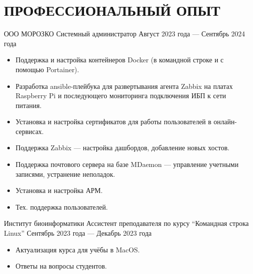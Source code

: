 \section{ПРОФЕССИОНАЛЬНЫЙ ОПЫТ}

    \job
        {ООО МОРОЗКО}
        {Системный администратор}
        {Август 2023 года --- Сентябрь 2024 года}

        \begin{itemize}
            \setlength\itemsep{-.5em}
            \item Поддержка и настройка контейнеров Docker (в командной строке и с помощью Portainer).
            \item Разработка ansible-плейбука для развертывания агента Zabbix на платах Raspberry Pi и последующего мониторинга подключения ИБП к сети питания.
            \item Установка и настройка сертификатов для работы пользователей в онлайн-сервисах.
            \item Поддержка Zabbix — настройка дашбордов, добавление новых хостов.
            \item Поддержка почтового сервера на базе MDaemon — управление учетными записями, устранение неполадок.
            \item Установка и настройка АРМ.
            \item Тех. поддержка пользователей.
        \end{itemize}

        \vspace{-0.5em}
    
    \job
        {Институт биоинформатики}
        {Ассистент преподавателя по курсу “Командная строка Linux”}
        {Сентябрь 2023 года — Декабрь 2023 года}

        \begin{itemize}
            \setlength\itemsep{-.5em}
            \item Актуализация курса для учёбы в MacOS.
            \item Ответы на вопросы студентов.
        \end{itemize}
